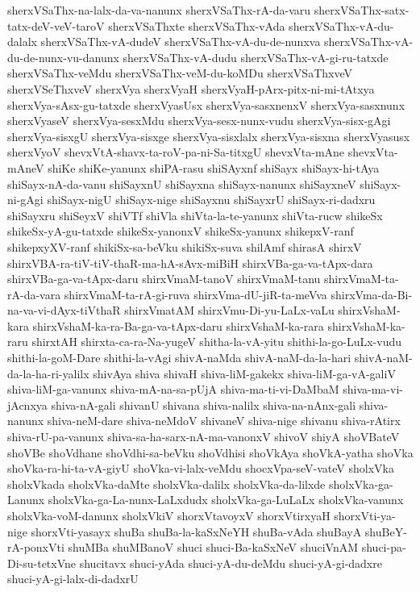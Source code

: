 {sherxVSaThx-na-lalx-da-va-nanunx
sherxVSaThx-rA-da-varu
sherxVSaThx-satx-tatx-deV-veV-taroV
sherxVSaThxte
sherxVSaThx-vAda
sherxVSaThx-vA-du-dalalx
sherxVSaThx-vA-dudeV
sherxVSaThx-vA-du-de-nunxva
sherxVSaThx-vA-du-de-nunx-vu-danunx
sherxVSaThx-vA-dudu
sherxVSaThx-vA-gi-ru-tatxde
sherxVSaThx-veMdu
sherxVSaThx-veM-du-koMDu
sherxVSaThxveV
sherxVSeThxveV
sherxVya
sherxVyaH
sherxVyaH-pArx-pitx-ni-mi-tAtxya
sherxVya-sAsx-gu-tatxde
sherxVyasUsx
sherxVya-sasxnenxV
sherxVya-sasxnunx
sherxVyaseV
sherxVya-sesxMdu
sherxVya-sesx-nunx-vudu
sherxVya-sisx-gAgi
sherxVya-sisxgU
sherxVya-sisxge
sherxVya-sisxlalx
sherxVya-sisxna
sherxVyasusx
sherxVyoV
shevxVtA-shavx-ta-roV-pa-ni-Sa-titxgU
shevxVta-mAne
shevxVta-mAneV
shiKe
shiKe-yanunx
shiPA-rasu
shiSAyxnf
shiSayx
shiSayx-hi-tAya
shiSayx-nA-da-vanu
shiSayxnU
shiSayxna
shiSayx-nanunx
shiSayxneV
shiSayx-ni-gAgi
shiSayx-nigU
shiSayx-nige
shiSayxnu
shiSayxrU
shiSayx-ri-dadxru
shiSayxru
shiSeyxV
shiVTf
shiVla
shiVta-la-te-yanunx
shiVta-rucw
shikeSx
shikeSx-yA-gu-tatxde
shikeSx-yanonxV
shikeSx-yanunx
shikepxV-ranf
shikepxyXV-ranf
shikiSx-sa-beVku
shikiSx-suva
shilAmf
shirasA
shirxV
shirxVBA-ra-tiV-tiV-thaR-ma-hA-sAvx-miBiH
shirxVBa-ga-va-tApx-dara
shirxVBa-ga-va-tApx-daru
shirxVmaM-tanoV
shirxVmaM-tanu
shirxVmaM-ta-rA-da-vara
shirxVmaM-ta-rA-gi-ruva
shirxVma-dU-jiR-ta-meVva
shirxVma-da-Bi-na-va-vi-dAyx-tiVthaR
shirxVmatAM
shirxVmu-Di-yu-LaLx-vaLu
shirxVshaM-kara
shirxVshaM-ka-ra-Ba-ga-va-tApx-daru
shirxVshaM-ka-rara
shirxVshaM-ka-raru
shirxtAH
shirxta-ca-ra-Na-yugeV
shitha-la-vA-yitu
shithi-la-go-LuLx-vudu
shithi-la-goM-Dare
shithi-la-vAgi
shivA-naMda
shivA-naM-da-la-hari
shivA-naM-da-la-ha-ri-yalilx
shivAya
shiva
shivaH
shiva-liM-gakekx
shiva-liM-ga-vA-galiV
shiva-liM-ga-vanunx
shiva-mA-na-sa-pUjA
shiva-ma-ti-vi-DaMbaM
shiva-ma-vi-jAcnxya
shiva-nA-gali
shivanU
shivana
shiva-nalilx
shiva-na-nAnx-gali
shiva-nanunx
shiva-neM-dare
shiva-neMdoV
shivaneV
shiva-nige
shivanu
shiva-rAtirx
shiva-rU-pa-vanunx
shiva-sa-ha-sarx-nA-ma-vanonxV
shivoV
shiyA
shoVBateV
shoVBe
shoVdhane
shoVdhi-sa-beVku
shoVdhisi
shoVkAya
shoVkA-yatha
shoVka
shoVka-ra-hi-ta-vA-giyU
shoVka-vi-lalx-veMdu
shocxVpa-seV-vateV
sholxVka
sholxVkada
sholxVka-daMte
sholxVka-dalilx
sholxVka-da-lilxde
sholxVka-ga-Lanunx
sholxVka-ga-La-nunx-LaLxdudx
sholxVka-ga-LuLaLx
sholxVka-vanunx
sholxVka-voM-danunx
sholxVkiV
shorxVtavoyxV
shorxVtirxyaH
shorxVti-ya-nige
shorxVti-yasayx
shuBa
shuBa-la-kaSxNeYH
shuBa-vAda
shuBayA
shuBeY-rA-ponxVti
shuMBa
shuMBanoV
shuci
shuci-Ba-kaSxNeV
shuciVnAM
shuci-pa-Di-su-tetxVne
shucitavx
shuci-yAda
shuci-yA-du-deMdu
shuci-yA-gi-dadxre
shuci-yA-gi-lalx-di-dadxrU
}
